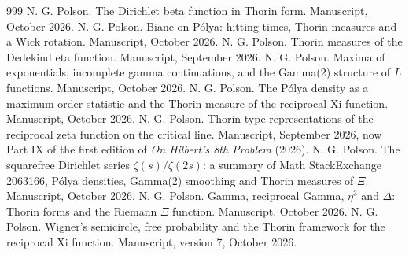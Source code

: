 \begin{thebibliography}{999}
 N. G. Polson. The Dirichlet beta function in Thorin form. Manuscript, October 2026.
 N. G. Polson. Biane on P\'olya: hitting times, Thorin measures and a Wick rotation. Manuscript, October 2026.
 N. G. Polson. Thorin measures of the Dedekind eta function. Manuscript, September 2026.
 N. G. Polson. Maxima of exponentials, incomplete gamma continuations, and the Gamma(2) structure of $L$ functions. Manuscript, October 2026.
 N. G. Polson. The P\'olya density as a maximum order statistic and the Thorin measure of the reciprocal Xi function. Manuscript, October 2026.
 N. G. Polson. Thorin type representations of the reciprocal zeta function on the critical line. Manuscript, September 2026, now Part IX of the first edition of \emph{On Hilbert's 8th Problem} (2026).
 N. G. Polson. The squarefree Dirichlet series $\zeta(s)/\zeta(2s)$: a summary of Math StackExchange 2063166, P\'olya densities, Gamma(2) smoothing and Thorin measures of $\Xi$. Manuscript, October 2026.
 N. G. Polson. Gamma, reciprocal Gamma, $\eta^3$ and $\Delta$: Thorin forms and the Riemann $\Xi$ function. Manuscript, October 2026.
 N. G. Polson. Wigner's semicircle, free probability and the Thorin framework for the reciprocal Xi function. Manuscript, version 7, October 2026.

\end{thebibliography}
